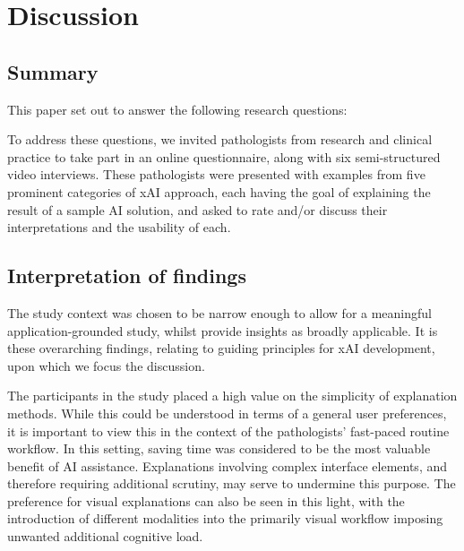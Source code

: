 \section{Discussion}
\label{sec:Discussion}

\subsection{Summary}
This paper set out to answer the following research questions:

\researchquestions


To address these questions, we invited pathologists from research and clinical practice to take part in an online questionnaire, along with six semi-structured video interviews. These pathologists were presented with examples from five prominent categories of xAI approach, each having the goal of explaining the result of a sample AI solution, and asked to rate and/or discuss their interpretations and the usability of each. 

\subsection{Interpretation of findings}

The study context was chosen to be narrow enough to allow for a meaningful application-grounded study, whilst provide insights as broadly applicable. It is these overarching findings, relating to guiding principles for xAI development, upon which we focus the discussion.

The participants in the study placed a high value on the simplicity of explanation methods. While this could be understood in terms of a general user preferences, it is important to view this in the context of the pathologists' fast-paced routine workflow. In this setting, saving time was considered to be the most valuable benefit of AI assistance. Explanations involving complex interface elements, and therefore requiring additional scrutiny, may serve to undermine this purpose. The preference for visual explanations can also be seen in this light, with the introduction of different modalities into the primarily visual workflow imposing unwanted additional cognitive load.

